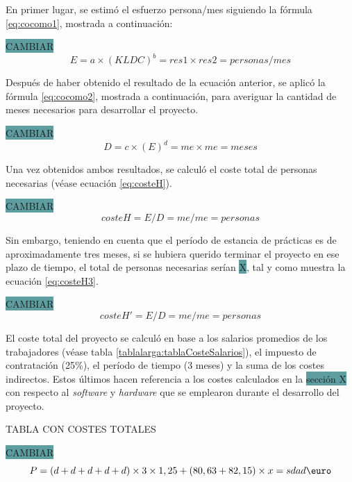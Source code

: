 \documentclass[pdftex,11pt,a4paper]{book}
\begin{document}
\vspace{-1,5cm}

En primer lugar, se estimó el esfuerzo persona/mes siguiendo la fórmula \ref{eq:cocomo1}, mostrada a continuación:

\colorbox{CadetBlue}{CAMBIAR}
\begin{equation}
E = a \times (KLDC) ^{b} = res1 \times res2 =  personas/mes
\label{eq:cocomo1}
\end{equation}

Después de haber obtenido el resultado de la ecuación anterior, se aplicó la fórmula \ref{eq:cocomo2}, mostrada a continuación, para averiguar la cantidad de meses necesarios para desarrollar el proyecto.

\colorbox{CadetBlue}{CAMBIAR}
\begin{equation}
D = c \times (E) ^{d} = me \times me = meses
\label{eq:cocomo2}
\end{equation}

Una vez obtenidos ambos resultados, se calculó el coste total de personas necesarias (véase ecuación \ref{eq:costeH}).

\colorbox{CadetBlue}{CAMBIAR}
\begin{equation}
costeH = E / D = me/me = personas
\label{eq:costeH}
\end{equation}

Sin embargo, teniendo en cuenta que el período de estancia de prácticas es de aproximadamente tres meses, si se hubiera querido terminar el proyecto en ese plazo de tiempo, el total de personas necesarias serían \colorbox{CadetBlue}{X}, tal y como muestra la ecuación \ref{eq:costeH3}.

\colorbox{CadetBlue}{CAMBIAR}
\begin{equation}
costeH' = E / D = me/me = personas
\label{eq:costeH3}
\end{equation}

El coste total del proyecto se calculó en base a los salarios promedios de los trabajadores (véase tabla \ref{tablalarga:tablaCosteSalarios}), el impuesto de contratación (25\%), el período de tiempo (3 meses) y la suma de los costes indirectos. Estos últimos hacen referencia a los costes calculados en la \colorbox{CadetBlue}{sección X} con respecto al \textit{software} y \textit{hardware} que se emplearon durante el desarrollo del proyecto.

TABLA CON COSTES TOTALES

\colorbox{CadetBlue}{CAMBIAR}
\begin{equation}
P = (d + d +d +d +d) \times 3 \times 1,25 + (80,63+82,15) \times x = sdad \textup{\euro}
\label{eq:presupuestoTotal}
\end{equation}
\end{document}
